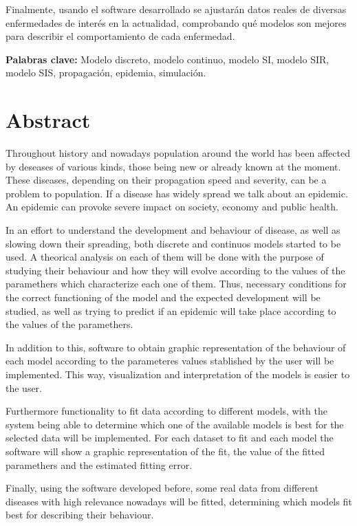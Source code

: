 Finalmente, usando el software desarrollado se ajustarán datos reales de diversas enfermedades de interés en la actualidad, comprobando qué modelos son mejores para describir el comportamiento de cada enfermedad.

\textbf{Palabras clave: } Modelo discreto, modelo continuo, modelo SI, modelo SIR, modelo SIS, propagación, epidemia, simulación.



\chapter*{Abstract}


Throughout history and nowadays population around the world has been affected by deseases of various kinds, those being new or already known at the moment. These diseases, depending on their propagation speed and severity, can be a problem to population. If a disease has widely spread we talk about an epidemic. An epidemic can provoke severe impact on society, economy and public health.

In an effort to understand the development and behaviour of disease, as well as slowing down their spreading, both discrete and continuos models started to be used. A theorical analysis on each of them will be done with the purpose of studying their behaviour and how they will evolve according to the values of the paramethers which characterize each one of them. Thus, necessary conditions for the correct functioning of the model and the expected development will be studied, as well as trying to predict if an epidemic will take place according to the values of the paramethers.

In addition to this, software  to obtain graphic representation of the behaviour of each model according to the parameteres values stablished by the user will be implemented. This way, visualization and interpretation of the models is easier to the user.

Furthermore functionality to fit data according to different models, with the system being able to determine which one of the available models is best for the selected data will be implemented. For each dataset to fit and each model the software will show a graphic representation of the fit, the value of the fitted paramethers and the estimated fitting error.

Finally, using the software developed before, some real data from different diseases with high relevance nowadays will be fitted, determining which models fit best for describing their behaviour.

